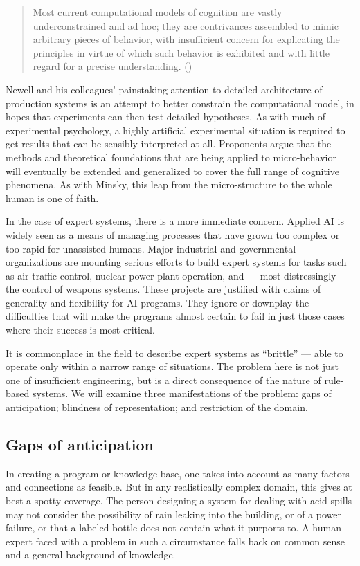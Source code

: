 \documentclass[12pt]{article}
\def\bq{\begin{quote}}
\def\eq{\end{quote}}
\begin{document}
\bq
Most current computational models of cognition are vastly underconstrained and ad hoc; they are contrivances assembled to mimic
arbitrary pieces of behavior, with insufficient concern for explicating the principles in virtue of which such behavior is exhibited and with little regard for a precise understanding. ({\it \cite{pylyshyn1984}})
\eq

Newell and his colleagues' painstaking attention to detailed architecture of production systems is an attempt to better constrain the computational model, in hopes that experiments can then test detailed hypotheses. As with much of experimental psychology, a highly artificial experimental situation is required to get results that can be sensibly interpreted at all. Proponents argue that the methods and theoretical foundations that are being applied to micro-behavior will eventually be extended and generalized to cover the full range of cognitive phenomena. As with Minsky, this leap from the micro-structure to the whole human is one of faith.

In the case of expert systems, there is a more immediate concern. Applied AI is widely seen as a means of managing processes that have grown too complex or too rapid for unassisted humans. Major industrial and governmental organizations are mounting serious efforts to build expert systems for tasks such as air traffic control, nuclear power plant operation, and --- most distressingly --- the control of weapons systems. These projects are justified with claims of generality and flexibility for AI programs. They ignore or downplay the difficulties that will make the programs almost certain to fail in just those cases where their success is most critical.

It is commonplace in the field to describe expert systems as ``brittle'' --- able to operate only within a narrow range of situations. The problem here is not just one of insufficient engineering, but is a direct consequence of the nature of rule-based systems. We will examine three manifestations of the problem: gaps of anticipation; blindness of representation; and restriction of the domain.

\subsection{Gaps of anticipation}

In creating a program or knowledge base, one takes into account as many factors and connections as feasible. But in any realistically complex domain, this gives at best a spotty coverage. The person designing a system for dealing with acid spills may not consider the possibility of rain leaking into the building, or of a power failure, or that a labeled bottle does not contain what it purports to. A human expert faced with a problem in such a circumstance falls back on common sense and a general background of knowledge.
\end{document}
